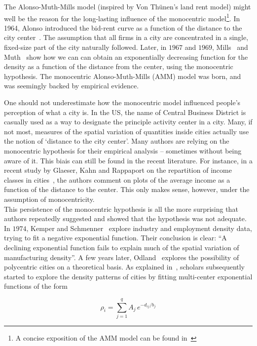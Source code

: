 The Alonso-Muth-Mills model (inspired by Von Th\"unen's land rent model)  might
well be the reason for the long-lasting influence of the monocentric
model\footnote{A concise exposition of the AMM model can be found
in~\cite{Brueckner:1987,Fujita:1989}}. In 1964, Alonso introduced the bid-rent
curve as a function of the distance to the city center~\cite{Alonso:1964}. The
assumption that all firms in a city are concentrated in a single, fixed-size
part of the city naturally followed. Later, in $1967$ and $1969$,
Mills~\cite{Mills:1967} and Muth~\cite{Muth:1969} show how we can can obtain an
exponentially decreasing function for the density as a function of the distance
from the center, using the monocentric hypothesis. The monocentric
Alonso-Muth-Mills (AMM) model was born, and was seemingly backed by empirical
evidence.

One should not underestimate how the monocentric model influenced people's
perception of what a city is. In the US, the name of Central Business District
is casually used as a way to designate the principle activity center in a city.
Many, if not most, measures of the spatial variation of quantities inside cities
actually use the notion of `distance to the city center'. Many authors are
relying on the monocentric hypothesis for their empirical analysis -- sometimes
without being aware of it. This biais can still be found in the recent
literature. For instance, in a recent study by Glaeser, Kahn and Rappaport on the
repartition of income classes in cities~\cite{Glaeser:2008}, the authors comment
on plots of the average income as a function of the distance to the center. This
only makes sense, however, under the assumption of monocentricity.\\


This persistence of the monocentric hypothesis is all the more surprising that
authors repeatedly suggested and showed that the hypothesis was not adequate. In
$1974$, Kemper and Schmenner~\cite{Kemper:1974} explore industry and
employment density data, trying to fit a negative exponential function. Their
conclusion is clear: ``A declining exponential function fails to explain much of
the spatial variation of manufacturing density''. A few years later,
Odland~\cite{Odland:1978} explores the possibility of polycentric cities on a
theoretical basis. As explained in~\cite{Griffith:1981}, scholars subsequently started to
explore the density patterns of cities by fitting multi-center exponential
functions of the form

\begin{equation}
    \rho_i = \sum_{j=1}^{q} A_j\,e^{-d_{ij}/b_j}
    \label{eq:multi-exponential}
\end{equation}

